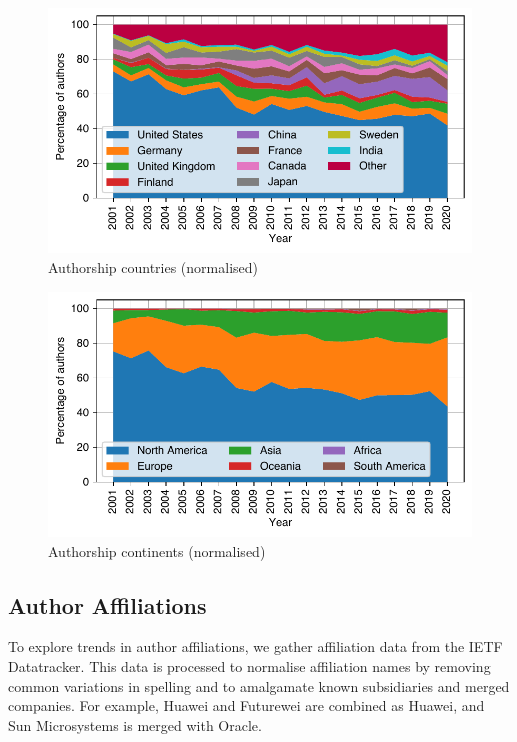 \documentclass[twocolumn,10pt]{article}
\newlength{\figureWidthOneColumn}
\begin{document}
\begin{figure}
  \centering
  \includegraphics[width=\figureWidthOneColumn]{figures-prev/imc-2021/authors/top5_countries_normalised.pdf}
  \caption{
    Authorship countries (normalised)
  }
  \label{fig:author_countries_normalised}
\end{figure}

\begin{figure}
  \centering
  \includegraphics[width=\figureWidthOneColumn]{figures-prev/imc-2021/authors/continents_normalised.pdf}
  \caption{
    Authorship continents (normalised)
  }
  \label{fig:author_continents_normalised}
\end{figure}

\subsection{Author Affiliations}
\label{sec:trends-demographics:affiliation}

To explore trends in author affiliations, we gather affiliation data from
the IETF Datatracker.  This data is processed to normalise affiliation
names by removing common variations in spelling and to amalgamate known
subsidiaries and merged companies. For example, Huawei and Futurewei are
combined as Huawei, and Sun Microsystems is merged with Oracle.
\end{document}
